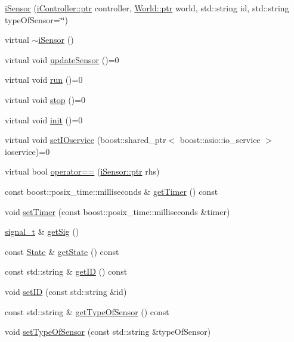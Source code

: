 \begin{DoxyCompactItemize}
\item 
\hyperlink{classo_cpt_1_1i_sensor_a548ca1dbeea64980181c434518659d3e}{i\+Sensor} (\hyperlink{classo_cpt_1_1i_controller_a6d89a95cd6ad68bb74adfaca2f36370f}{i\+Controller\+::ptr} controller, \hyperlink{classo_cpt_1_1_world_aa6e591e3096d5de71e0cec9039663d67}{World\+::ptr} world, std\+::string id, std\+::string type\+Of\+Sensor=\char`\"{}\char`\"{})
\item 
virtual \hyperlink{classo_cpt_1_1i_sensor_a47eeead807cf3dc127fe55df4bc68c47}{$\sim$i\+Sensor} ()
\item 
virtual void \hyperlink{classo_cpt_1_1i_sensor_aa55bc04979e4852989af2bd4f64e70bc}{update\+Sensor} ()=0
\item 
virtual void \hyperlink{classo_cpt_1_1i_sensor_abbface05a16b17354c23389d9747bf7c}{run} ()=0
\item 
virtual void \hyperlink{classo_cpt_1_1i_sensor_aa85c22a8c8f7c2445379e1f82835f8dc}{stop} ()=0
\item 
virtual void \hyperlink{classo_cpt_1_1i_sensor_aa8def4a41b8280f7e4e02285cd7bd734}{init} ()=0
\item 
virtual void \hyperlink{classo_cpt_1_1i_sensor_a83b62cc63498ca4c335f85639e39656d}{set\+I\+Oservice} (boost\+::shared\+\_\+ptr$<$ boost\+::asio\+::io\+\_\+service $>$ ioservice)=0
\item 
virtual bool \hyperlink{classo_cpt_1_1i_sensor_affc8319846828aac6cab641f294a04aa}{operator==} (\hyperlink{classo_cpt_1_1i_sensor_a03533d2c5dc66e332d70dbb3b5e3006a}{i\+Sensor\+::ptr} rhs)
\item 
const boost\+::posix\+\_\+time\+::milliseconds \& \hyperlink{classo_cpt_1_1i_sensor_ad1651243755d72d5fd69668444555c77}{get\+Timer} () const
\item 
void \hyperlink{classo_cpt_1_1i_sensor_a4c956646ebf60201b5b23e0f5ad288ce}{set\+Timer} (const boost\+::posix\+\_\+time\+::milliseconds \&timer)
\item 
\hyperlink{classo_cpt_1_1i_sensor_a2e6d170acbc05f0b557bb68671813f6d}{signal\+\_\+t} \& \hyperlink{classo_cpt_1_1i_sensor_ad63e4d791b76f8328d652c4ed79eaec3}{get\+Sig} ()
\item 
const \hyperlink{structo_cpt_1_1i_sensor_1_1_state}{State} \& \hyperlink{classo_cpt_1_1i_sensor_a9ab760449e01c754c30374641c51ac66}{get\+State} () const
\item 
const std\+::string \& \hyperlink{classo_cpt_1_1i_sensor_aba86d11b74b8393c5ed0dfb2ec3b93d7}{get\+ID} () const
\item 
void \hyperlink{classo_cpt_1_1i_sensor_a2dec47e27c1e0843a1f874e28a522abd}{set\+ID} (const std\+::string \&id)
\item 
const std\+::string \& \hyperlink{classo_cpt_1_1i_sensor_aa356e53521301d555a7cbcee84bf54ea}{get\+Type\+Of\+Sensor} () const
\item 
void \hyperlink{classo_cpt_1_1i_sensor_ad1927865eb4ebfebc3dd840f66d98c1f}{set\+Type\+Of\+Sensor} (const std\+::string \&type\+Of\+Sensor)
\end{DoxyCompactItemize}
